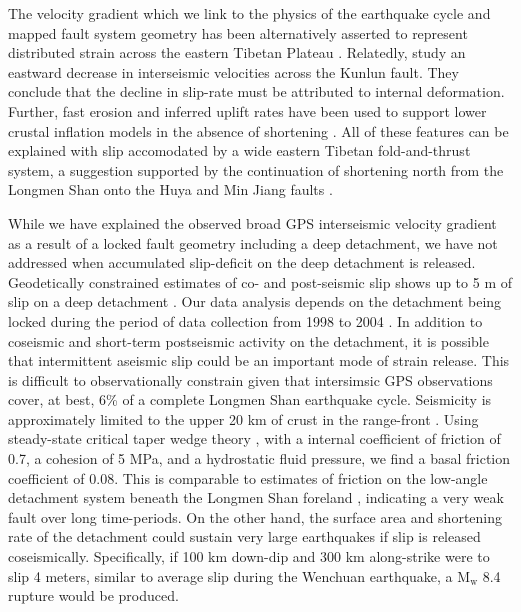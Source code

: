 \documentclass[12pt]{article}
\begin{document}
The velocity gradient which we link to the physics of the earthquake cycle and mapped fault system geometry has been alternatively asserted to represent distributed strain across the eastern Tibetan Plateau \citep{Royden2008}. Relatedly, \citet{kirby07} study an eastward decrease in interseismic velocities across the Kunlun fault. They conclude that the decline in slip-rate must be attributed to internal deformation. Further, fast erosion and inferred uplift rates have been used to support lower crustal inflation models in the absence of shortening \citep{Kirby2003}. All of these features can be explained with slip accomodated by a wide eastern Tibetan fold-and-thrust system, a suggestion supported by the continuation of shortening north from the Longmen Shan onto the Huya \citep{kirby00} and Min Jiang faults \citep{Chen1994}. 

While we have explained the observed broad GPS interseismic velocity gradient as a result of a locked fault geometry including a deep detachment, we have not addressed when accumulated slip-deficit on the deep detachment is released. Geodetically constrained estimates of co- and post-seismic slip shows up to 5 m of slip on a deep detachment \citep{Qi2011}. Our data analysis depends on the detachment being locked during the period of data collection from 1998 to 2004 \citep{gan07}. In addition to coseismic and short-term postseismic activity on the detachment, it is possible that intermittent aseismic slip could be an important mode of strain release. This is difficult to observationally constrain given that intersimsic GPS observations cover, at best, 6\% of a complete Longmen Shan earthquake cycle. Seismicity is approximately limited to the upper 20 km of crust in the range-front \citep{Li2010a}. Using steady-state critical taper wedge theory \citep{dahlen90}, with a internal coefficient of friction of 0.7, a cohesion of 5 MPa, and a hydrostatic fluid pressure, we find a basal friction coefficient of 0.08. This is comparable to estimates of friction on the low-angle detachment system beneath the Longmen Shan foreland \citep{Hubbard2010}, indicating a very weak fault over long time-periods. On the other hand, the surface area and shortening rate of the detachment could sustain very large earthquakes if slip is released coseismically. Specifically, if 100 km down-dip and 300 km along-strike were to slip 4 meters, similar to average slip during the Wenchuan earthquake, a $\textrm{M}_{\textrm{w}}$ 8.4 rupture would be produced.
\end{document}
